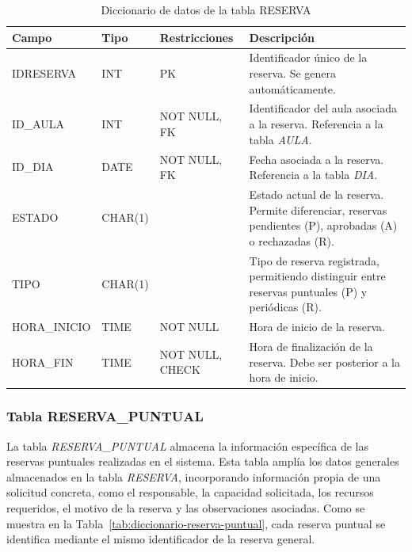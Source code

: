 \begin{table}[H]
	\centering
	\scriptsize
	\setlength{\tabcolsep}{3pt}
	\renewcommand{\arraystretch}{1.15}
	\begin{tabularx}{\textwidth}{@{}
			>{\raggedright\arraybackslash}p{2.6cm}
			>{\raggedright\arraybackslash}p{2.2cm}
			>{\raggedright\arraybackslash}p{2.2cm}
			X@{}}
		\toprule
		\textbf{Campo} & \textbf{Tipo} & \textbf{Restricciones} & \textbf{Descripción} \\
		\midrule
		IDRESERVA & INT & PK & Identificador único de la reserva. Se genera automáticamente. \\
		ID\_AULA & INT & NOT NULL, FK & Identificador del aula asociada a la reserva. Referencia a la tabla \textit{AULA}. \\
		ID\_DIA & DATE & NOT NULL, FK & Fecha asociada a la reserva. Referencia a la tabla \textit{DIA}. \\
		ESTADO & CHAR(1) &  & Estado actual de la reserva. Permite diferenciar, reservas pendientes (P), aprobadas (A) o rechazadas (R). \\
		TIPO & CHAR(1) &  & Tipo de reserva registrada, permitiendo distinguir entre reservas puntuales (P) y periódicas (R). \\
		HORA\_\newline INICIO & TIME & NOT NULL & Hora de inicio de la reserva. \\
		HORA\_FIN & TIME & NOT NULL, CHECK & Hora de finalización de la reserva. Debe ser posterior a la hora de inicio. \\
		\bottomrule
	\end{tabularx}
	\caption{Diccionario de datos de la tabla RESERVA}
	\label{tab:diccionario-reserva}
\end{table}

\subsubsection{Tabla RESERVA\_PUNTUAL}

 La tabla \textit{RESERVA\_PUNTUAL} almacena la información específica de las reservas puntuales realizadas en el sistema. Esta tabla amplía los datos generales almacenados en la tabla \textit{RESERVA}, incorporando información propia de una solicitud concreta, como el responsable, la capacidad solicitada, los recursos requeridos, el motivo de la reserva y las observaciones asociadas. Como se muestra en la Tabla~\ref{tab:diccionario-reserva-puntual}, cada reserva puntual se identifica mediante el mismo identificador de la reserva general.\\

